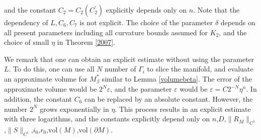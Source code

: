 \documentclass[11pt,letterpaper]{amsart}
\numberwithin{equation}{section}
\theoremstyle{definition}
\theoremstyle{plain}
\theoremstyle{definition}
\theoremstyle{plain}
\theoremstyle{definition}
\theoremstyle{plain}
\newcommand{\vol}{\textrm{vol}}
\begin{document}
and the constant $C_2=C_2(C_2^{\prime})$ explicitly depends only on $n$. Note that the dependency of $L,C_6,C_7$ is not explicit.
The choice of the parameter $\delta$ depends on all present parameters including all curvature bounds assumed for $K_2$, and the choice of small $\eta$ in Theorem \ref{2007}.

We remark that one can obtain an explicit estimate without using the parameter $L$. To do this, one can use all $N$ number of $\Gamma_i$ to slice the manifold, and evaluate an approximate volume for $M_{\beta}^{\ast}$ similar to Lemma \ref{volumebeta}. The error of the approximate volume would be $2^N \varepsilon$, and the parameter $\varepsilon$ would be $\varepsilon=C2^{-N}\eta^n$.
In addition, the constant $C_6$ can be replaced by an absolute constant. However, the number $2^N$ grows exponentially in $\eta$.
This process results in an explicit estimate with three logarithms, and the constants explicitly depend only on $n$,$D$,$\|R_M\|_{C^1}$,$\|S\|_{C^1}$,$i_0$,$r_0$,$\vol(M)$,$\vol(\partial M)$.
\end{document}
